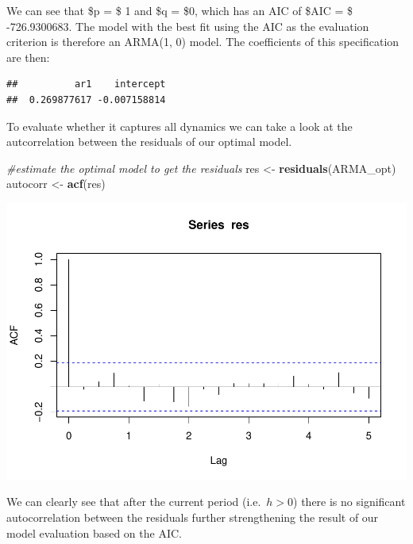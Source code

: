 \documentclass[]{article}
\newenvironment{Shaded}{\begin{snugshade}}{\end{snugshade}}
\newcommand{\CommentTok}[1]{\textcolor[rgb]{0.56,0.35,0.01}{\textit{#1}}}
\newcommand{\DataTypeTok}[1]{\textcolor[rgb]{0.13,0.29,0.53}{#1}}
\newcommand{\DecValTok}[1]{\textcolor[rgb]{0.00,0.00,0.81}{#1}}
\newcommand{\KeywordTok}[1]{\textcolor[rgb]{0.13,0.29,0.53}{\textbf{#1}}}
\newcommand{\NormalTok}[1]{#1}
\newcommand{\OperatorTok}[1]{\textcolor[rgb]{0.81,0.36,0.00}{\textbf{#1}}}
\newcommand{\StringTok}[1]{\textcolor[rgb]{0.31,0.60,0.02}{#1}}
\begin{document}
We can see that \$p = \$ 1 and \$q = \$0, which has an AIC of \$AIC = \$
-726.9300683. The model with the best fit using the AIC as the
evaluation criterion is therefore an ARMA(1, 0) model. The coefficients
of this specification are then:

\begin{Shaded}
\end{Shaded}

\begin{verbatim}
##          ar1    intercept 
##  0.269877617 -0.007158814
\end{verbatim}

To evaluate whether it captures all dynamics we can take a look at the
autcorrelation between the residuals of our optimal model.

\begin{Shaded}
\begin{Highlighting}[]
\CommentTok{#estimate the optimal model to get the residuals}
\NormalTok{res <-}\StringTok{ }\KeywordTok{residuals}\NormalTok{(ARMA_opt)}
\NormalTok{autocorr <-}\StringTok{ }\KeywordTok{acf}\NormalTok{(res)}
\end{Highlighting}
\end{Shaded}

\includegraphics{figure-latex/unnamed-chunk-7-1.pdf}

We can clearly see that after the current period (i.e.~\(h > 0\)) there
is no significant autocorrelation between the residuals further
strengthening the result of our model evaluation based on the AIC.
\end{document}
